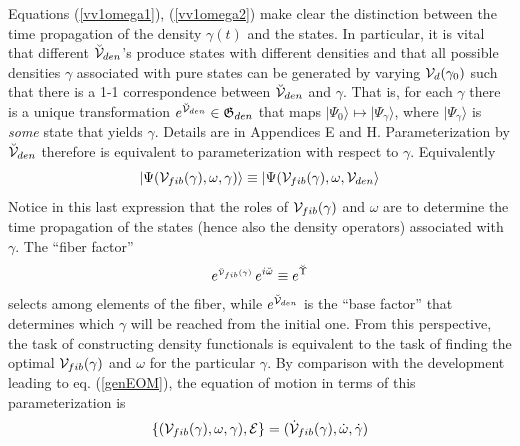 Equations (\ref{vv1omega1}), (\ref{vv1omega2}) make clear the distinction
between the time propagation of the density $\gamma (t)$ and the states. In
particular, it is vital that different $\breve{{\cal V}}_{den}$'s produce
states with different densities and that all possible densities $\gamma $
associated with pure states can be generated by varying ${\cal V}_{d}(\gamma
_{0})$ such that there is a 1-1 correspondence between $\breve{{\cal V}}%
_{den}$ and $\gamma $. That is, for each $\gamma $ there is a unique
transformation $e^{\breve{{\cal V}}_{den}}\in {\frak G}_{den}$ that maps $%
|\Psi _{0}\rangle \mapsto |\Psi _{\gamma }\rangle $, where $|\Psi _{\gamma
}\rangle $ is {\em some} state that yields $\gamma $. Details are in
Appendices E and H. Parameterization by $\breve{{\cal V}}_{den}$ therefore
is equivalent to parameterization with respect to $\gamma $. Equivalently 
\begin{equation}
|\Psi ({\cal V}_{fib}(\gamma ),\omega ,\gamma )\rangle \equiv |\Psi ({\cal V}%
_{fib}(\gamma ),\omega ,{\cal V}_{den}\rangle
\end{equation}%
Notice in this last expression that the roles of ${\cal V}_{fib}(\gamma )$
and $\omega $ are to determine the time propagation of the states (hence
also the density operators) associated with $\gamma $. The ``fiber factor'' 
\begin{equation}
e^{_{{\cal \breve{V}}_{fib}(\gamma )}}\,e^{i\breve{\omega}}\equiv e^{\breve{%
\Upsilon}}  \label{fiberfactor}
\end{equation}%
selects among elements of the fiber, while $e^{\breve{{\cal V}}_{den}}$ is
the ``base factor'' that determines which $\gamma $ will be reached from the
initial one. From this perspective, the task of constructing density
functionals is equivalent to the task of finding the optimal ${\cal V}%
_{fib}(\gamma )$ and $\omega $ for the particular $\gamma $. By comparison
with the development leading to eq. (\ref{genEOM}), the equation of motion
in terms of this parameterization is 
\begin{equation}
\{({\cal V}_{fib}(\gamma ),\omega ,\gamma ),{\cal E}\}=({\cal \dot{V}}%
_{fib}(\gamma ),\dot{\omega},\dot{\gamma})  \label{Vomegagammaeom}
\end{equation}

